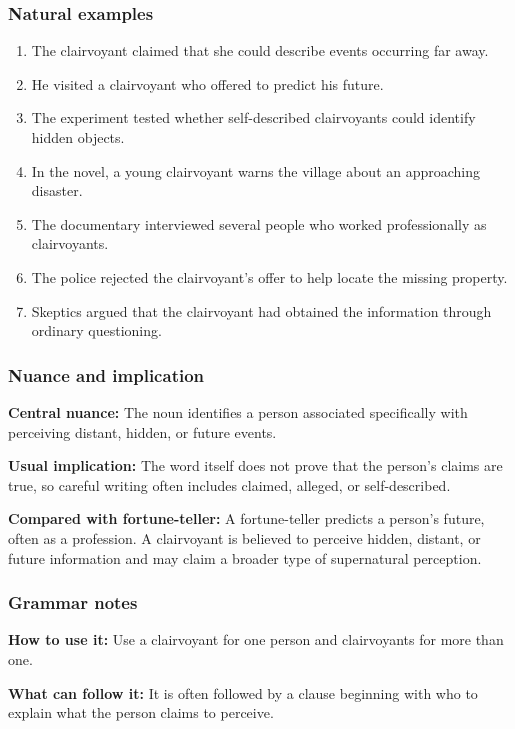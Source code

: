 \documentclass[11pt]{article}
\begin{document}
\subsubsection{Natural examples}
\begin{enumerate}
  \item The clairvoyant claimed that she could describe events occurring far away.
  \item He visited a clairvoyant who offered to predict his future.
  \item The experiment tested whether self-described clairvoyants could identify hidden objects.
  \item In the novel, a young clairvoyant warns the village about an approaching disaster.
  \item The documentary interviewed several people who worked professionally as clairvoyants.
  \item The police rejected the clairvoyant's offer to help locate the missing property.
  \item Skeptics argued that the clairvoyant had obtained the information through ordinary questioning.
\end{enumerate}

\subsubsection{Nuance and implication}
\textbf{Central nuance:} The noun identifies a person associated specifically with perceiving distant, hidden, or future events.

\textbf{Usual implication:} The word itself does not prove that the person's claims are true, so careful writing often includes claimed, alleged, or self-described.

\textbf{Compared with fortune-teller:} A fortune-teller predicts a person's future, often as a profession. A clairvoyant is believed to perceive hidden, distant, or future information and may claim a broader type of supernatural perception.

\subsubsection{Grammar notes}
\textbf{How to use it:} Use a clairvoyant for one person and clairvoyants for more than one.

\textbf{What can follow it:} It is often followed by a clause beginning with who to explain what the person claims to perceive.
\end{document}
